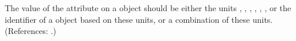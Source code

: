 The value of the attribute  on a \Model object should be
either the units , , ,
, , , or the identifier of a
\UnitDefinition object based on these units, or a combination of these units.  (References: .)
